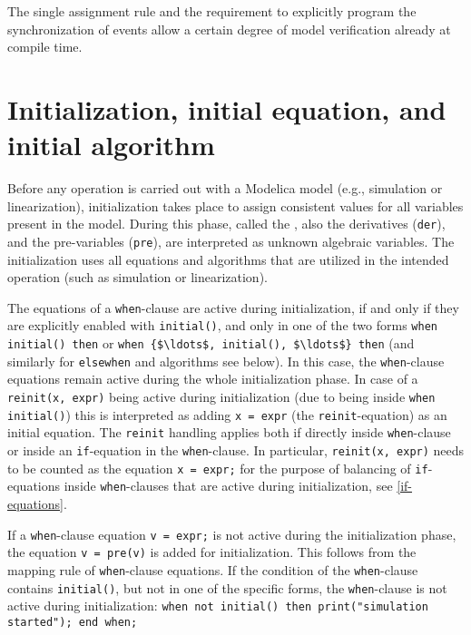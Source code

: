 \begin{nonnormative}
The single assignment rule and the requirement to explicitly program the synchronization of events allow a certain degree of model verification already at compile time.
\end{nonnormative}


\section{Initialization, initial equation, and initial algorithm}\label{initialization-initial-equation-and-initial-algorithm}

Before any operation is carried out with a Modelica model (e.g., simulation or linearization), initialization takes place to assign consistent values for all variables present in the model.
During this phase, called the , also the derivatives (\lstinline!der!), and the pre-variables (\lstinline!pre!), are interpreted as unknown algebraic variables.
The initialization uses all equations and algorithms that are utilized in the intended operation (such as simulation or linearization).

The equations of a \lstinline!when!-clause are active during initialization, if and only if they are explicitly enabled with \lstinline!initial()!, and only in one of the two forms \lstinline!when initial() then! or \lstinline!when {$\ldots$, initial(), $\ldots$} then! (and similarly for \lstinline!elsewhen! and algorithms see below).
In this case, the \lstinline!when!-clause equations remain active during the whole initialization phase.
In case of a \lstinline!reinit(x, expr)! being active during initialization (due to being inside \lstinline!when initial()!) this is interpreted as adding \lstinline!x = expr! (the \lstinline!reinit!-equation) as an initial equation.
The \lstinline!reinit! handling applies both if directly inside \lstinline!when!-clause or inside an \lstinline!if!-equation in the \lstinline!when!-clause.
In particular, \lstinline!reinit(x, expr)! needs to be counted as the equation \lstinline!x = expr;! for the purpose of balancing of \lstinline!if!-equations inside \lstinline!when!-clauses that are active during initialization, see \cref{if-equations}.

\begin{nonnormative}
If a \lstinline!when!-clause equation \lstinline!v = expr;! is not active during the initialization phase, the equation \lstinline!v = pre(v)! is added for initialization.
This follows from the mapping rule of \lstinline!when!-clause equations.
If the condition of the \lstinline!when!-clause contains \lstinline!initial()!,
but not in one of the specific forms, the \lstinline!when!-clause is not active during initialization: \lstinline!when not initial() then print("simulation started"); end when;!
\end{nonnormative}

